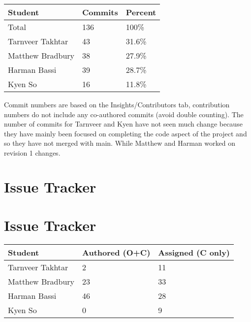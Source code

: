 \documentclass{article}
\begin{document}
\begin{table}[H]
    \centering
    \begin{tabular}{lll}
    \toprule
    \textbf{Student} & \textbf{Commits} & \textbf{Percent}\\
    \midrule
    Total & 136 & 100\% \\
    Tarnveer Takhtar & 43 & 31.6\%\\
    Matthew Bradbury & 38 & 27.9\%\\
    Harman Bassi & 39 & 28.7\%\\
    Kyen So & 16 & 11.8\%\\
    \bottomrule
    \end{tabular}
    \end{table}

Commit numbers are based on the Insights/Contributors tab, contribution numbers do not include any co-authored commits (avoid double counting).
The number of commits for Tarnveer and Kyen have not seen much change because they have mainly been focused on completing the code aspect of the project 
and so they have not merged with main. While Matthew and Harman worked on revision 1 changes.

\section{Issue Tracker}

\section{Issue Tracker}

\begin{table}[H]
\centering
\begin{tabular}{lll}
\toprule
\textbf{Student} & \textbf{Authored (O+C)} & \textbf{Assigned (C only)}\\
\midrule
Tarnveer Takhtar & 2 & 11\\
Matthew Bradbury & 23 & 33\\
Harman Bassi & 46 & 28\\
Kyen So & 0 & 9\\
\bottomrule
\end{tabular}
\end{table}
\end{document}
